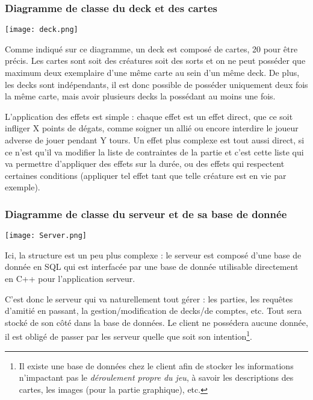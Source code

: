 \documentclass[12pt]{article}
\begin{document}
		\subsubsection{Diagramme de classe du \gls{deck} et des cartes}
		\begin{center}\texttt{[image: deck.png]}\end{center}
			Comme indiqué sur ce diagramme, un \gls{deck} est composé de cartes, 20 pour être précis. Les cartes sont soit des créatures
			soit des \glspl{sort} et on ne peut posséder que maximum deux exemplaire d'une même carte au sein d'un même \gls{deck}.
			De plus, les \glspl{deck} sont indépendants, il est donc possible de posséder uniquement deux fois la même carte, mais avoir plusieurs \glspl{deck} la possédant au moins une fois.

			L'application des effets est simple : chaque effet est un effet direct, que ce soit infliger X points de dégats, comme soigner un allié ou encore interdire le joueur adverse de jouer pendant Y tours.
			Un effet plus complexe est tout aussi direct, si ce n'est qu'il va modifier la liste de contraintes de la partie et c'est cette liste qui va permettre d'appliquer des effets sur la durée, ou des effets qui respectent certaines conditions (appliquer tel effet tant que telle créature est en vie par exemple).
	

		\subsubsection{Diagramme de classe du serveur et de sa base de donnée}
		\begin{center}\texttt{[image: Server.png]}\end{center}
			Ici, la structure est un peu plus complexe : le serveur est composé d'une base de donnée en SQL qui est interfacée par une base de donnée utilisable directement en C++ pour l'application serveur.

			C'est donc le serveur qui va naturellement tout gérer : les parties, les requêtes d'amitié en passant,
			la gestion/modification de \glspl{deck}/de comptes, etc. Tout sera stocké de son côté dans la base de données.
			Le client ne possédera aucune donnée, il est obligé de passer par les serveur quelle que soit son intention\footnote{Il existe une base de
			données chez le client afin de stocker les informations n'impactant pas le \textit{déroulement propre du jeu}, à savoir les descriptions des cartes,
			les images (pour la partie graphique), etc.}.
\end{document}
